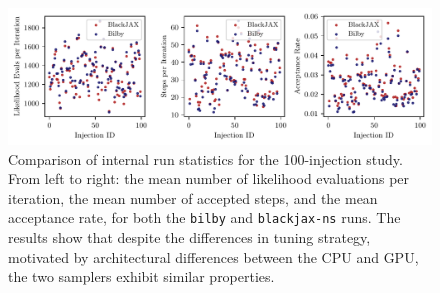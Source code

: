 \documentclass[fleqn,usenatbib]{mnras}
\begin{document}
\begin{figure}
    \centering
    \includegraphics{figures/performance_metrics.pdf}
    \caption{Comparison of internal run statistics for the 100-injection
    study. From left to right: the mean number of likelihood evaluations per iteration,
    the mean number of accepted steps, and the mean acceptance rate, for both the \texttt{bilby} and 
    \texttt{blackjax-ns} runs. The results show that despite the differences in tuning strategy,
    motivated by architectural differences between the CPU and GPU, the two samplers exhibit similar
    properties.}
    \label{fig:injection_study_stats}
\end{figure}

\end{document}
